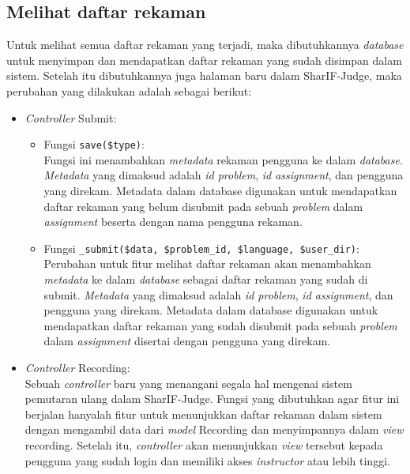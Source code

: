 \subsection{Melihat daftar rekaman}
\label{sub:4:3:melihatdaftarrekaman}

Untuk melihat semua daftar rekaman yang terjadi, maka dibutuhkannya \textit{database} untuk menyimpan dan mendapatkan daftar rekaman yang sudah disimpan dalam sistem. Setelah itu dibutuhkannya juga halaman baru dalam SharIF-Judge, maka perubahan yang dilakukan adalah sebagai berikut:

\begin{itemize}
    \item \textit{Controller} Submit:
          \begin{itemize}
              \item Fungsi \verb|save($type)|: \\
                    Fungsi ini menambahkan \textit{metadata} rekaman pengguna ke dalam \textit{database}. \textit{Metadata} yang dimaksud adalah \textit{id problem}, \textit{id assignment}, dan pengguna yang direkam. Metadata dalam database digunakan untuk mendapatkan daftar rekaman yang belum disubmit pada sebuah \textit{problem} dalam \textit{assignment} beserta dengan nama pengguna rekaman.
              \item Fungsi \verb|_submit($data, $problem_id, $language, $user_dir)|: \\
                    Perubahan untuk fitur melihat daftar rekaman akan menambahkan \textit{metadata} ke dalam \textit{database} sebagai daftar rekaman yang sudah di submit. \textit{Metadata} yang dimaksud adalah \textit{id problem}, \textit{id assignment}, dan pengguna yang direkam. Metadata dalam database digunakan untuk mendapatkan daftar rekaman yang sudah disubmit pada sebuah \textit{problem} dalam \textit{assignment} disertai dengan pengguna yang direkam.
          \end{itemize}
    \item \textit{Controller} Recording: \\
          Sebuah \textit{controller} baru yang menangani segala hal mengenai sistem pemutaran ulang dalam SharIF-Judge. Fungsi yang dibutuhkan agar fitur ini berjalan hanyalah fitur untuk menunjukkan daftar rekaman dalam sistem dengan mengambil data dari \textit{model} Recording dan menyimpannya dalam \textit{view} recording. Setelah itu, \textit{controller} akan menunjukkan \textit{view} tersebut kepada pengguna yang sudah login dan memiliki akses \textit{instructor} atau lebih tinggi.

\end{itemize}
